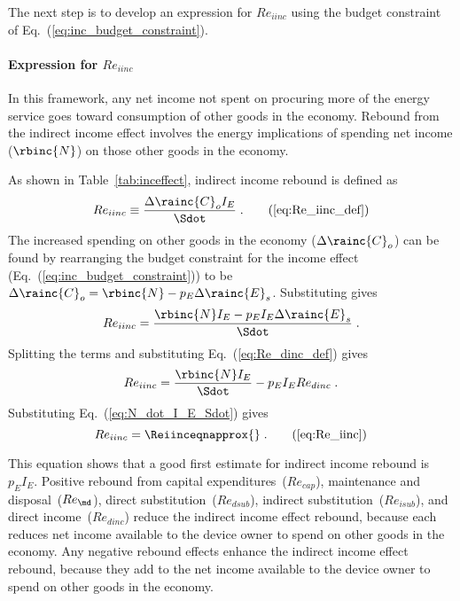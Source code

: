 The next step is to develop an expression for $Re_{iinc}$
using the budget constraint of Eq.~(\ref{eq:inc_budget_constraint}).

\paragraph{Expression for $Re_{iinc}$}
\label{sec:Re_iinc}

In this framework,
any net income not spent on procuring more of the energy service
goes toward consumption of other goods in the economy.
Rebound from the indirect income effect involves 
the energy implications of spending net income ($\rbinc{N}$)
on those other goods in the economy.

As shown in Table~\ref{tab:inceffect}, indirect income rebound is defined as
%
\begin{equation}
  Re_{iinc} \equiv \frac{\Delta \rainc{C}_o I_E}{\Sdot} \; . \tag{\ref{eq:Re_iinc_def}}
\end{equation}
%
The increased spending on other goods in the economy ($\Delta \rainc{C}_o$)
can be found by rearranging the budget constraint for the income effect 
(Eq.~(\ref{eq:inc_budget_constraint})) to be 
$\Delta \rainc{C}_o = \rbinc{N} - p_E \Delta \rainc{E}_s$.
Substituting gives
%
\begin{equation}
  Re_{iinc} = \frac{\rbinc{N} I_E - p_E I_E \Delta \rainc{E}_s}{\Sdot} \; .
\end{equation}
%
Splitting the terms and substituting Eq.~(\ref{eq:Re_dinc_def}) gives
%
\begin{equation}
  Re_{iinc} = \frac{\rbinc{N} I_E}{\Sdot} - p_E I_E Re_{dinc} \; .
\end{equation}
%
Substituting Eq.~(\ref{eq:N_dot_I_E_Sdot}) gives 
%
\begin{equation}
  Re_{iinc} = \Reiinceqnapprox{} \; . \tag{\ref{eq:Re_iinc}}
\end{equation}

This equation shows that a good first estimate for indirect income rebound
is $p_E I_E$.
Positive rebound from capital expenditures~($Re_{cap}$), 
maintenance and disposal~($Re_{\md}$),
direct substitution~($Re_{dsub}$), 
indirect substitution~($Re_{isub}$), and 
direct income~($Re_{dinc}$)
reduce the indirect income effect rebound, 
because each reduces net income available to the device owner to spend on other goods in the economy.
Any negative rebound effects enhance the indirect income effect rebound, because 
they add to the net income available to the device owner to spend on other goods in the economy.


